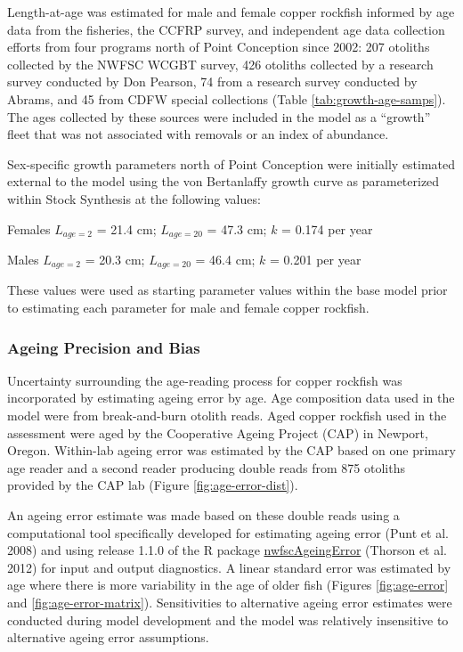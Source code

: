 \documentclass[11pt,
  english,
  letterpaper,
]{article}
\begin{document}
Length-at-age was estimated for male and female copper rockfish informed by age data from the fisheries, the CCFRP survey, and independent age data collection efforts from four programs north of Point Conception since 2002: 207 otoliths collected by the NWFSC WCGBT survey, 426 otoliths collected by a research survey conducted by Don Pearson, 74 from a research survey conducted by Abrams, and 45 from CDFW special collections (Table \ref{tab:growth-age-samps}). The ages collected by these sources were included in the model as a ``growth'' fleet that was not associated with removals or an index of abundance.

Sex-specific growth parameters north of Point Conception were initially estimated external to the model using the von Bertanlaffy growth curve as parameterized within Stock Synthesis at the following values:

\begin{centering}

Females $L_{age=2}$ = 21.4 cm; $L_{age=20}$ = 47.3 cm; $k$ = 0.174 per year

Males $L_{age=2}$ = 20.3 cm; $L_{age=20}$ = 46.4 cm; $k$ = 0.201 per year

\end{centering}

\vspace{0.50cm}

These values were used as starting parameter values within the base model prior to estimating each parameter for male and female copper rockfish.

\hypertarget{ageing-precision-and-bias}{%
\subsubsection{Ageing Precision and Bias}\label{ageing-precision-and-bias}}

Uncertainty surrounding the age-reading process for copper rockfish was incorporated by estimating ageing error by age. Age composition data used in the model were from break-and-burn otolith reads. Aged copper rockfish used in the assessment were aged by the Cooperative Ageing Project (CAP) in Newport, Oregon. Within-lab ageing error was estimated by the CAP based on one primary age reader and a second reader producing double reads from 875 otoliths provided by the CAP lab (Figure \ref{fig:age-error-dist}).

An ageing error estimate was made based on these double reads using a computational tool specifically developed for estimating ageing error (Punt et al. 2008) and using release 1.1.0 of the R package \href{https://github.com/nwfsc-assess/nwfscAgeingError}{nwfscAgeingError} (Thorson et al. 2012) for input and output diagnostics. A linear standard error was estimated by age where there is more variability in the age of older fish (Figures \ref{fig:age-error} and \ref{fig:age-error-matrix}). Sensitivities to alternative ageing error estimates were conducted during model development and the model was relatively insensitive to alternative ageing error assumptions.
\end{document}

